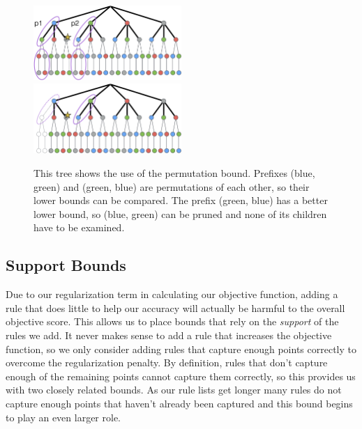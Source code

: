 \documentclass[]{report}
\theoremstyle{definition}
\begin{document}
\begin{figure}
\includegraphics[width=0.5\textwidth]{figs/ela_branch-and-bound-permutations.png}
\includegraphics[width=0.5\textwidth]{figs/ela_branch-and-bound-permutations-pruned.png}
\caption[Permutation bound]{This tree shows the use of the permutation bound. Prefixes (blue, green) and (green, blue) are permutations of each other, so their lower bounds can be compared. The prefix (green, blue) has a better lower bound, so (blue, green) can be pruned and none of its children have to be examined.
\label{fig:permutation-bound}}
\end{figure}

\subsection{Support Bounds}
Due to our regularization term in calculating our objective function, adding a rule that does little to help our accuracy will actually be harmful to the overall objective score.
This allows us to place bounds that rely on the \textit{support} of the rules we add.
It never makes sense to add a rule that increases the objective function, so we only consider adding rules that capture enough points correctly to overcome the regularization penalty.
By definition, rules that don't capture enough of the remaining points cannot capture them correctly, so this provides us with two closely related bounds.
As our rule lists get longer many rules do not capture enough points that haven't already been captured and this bound begins to play an even larger role.
\end{document}
